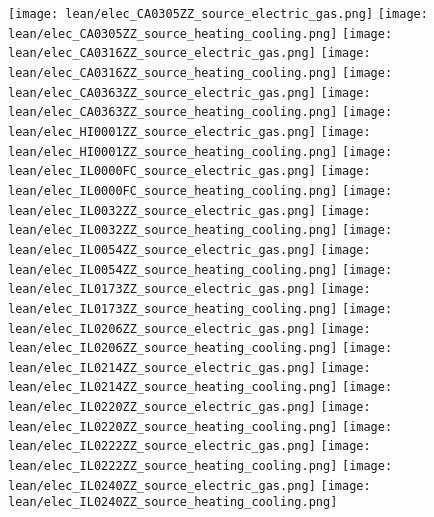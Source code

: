 \texttt{[image: lean/elec\_CA0305ZZ\_source\_electric\_gas.png]}
\texttt{[image: lean/elec\_CA0305ZZ\_source\_heating\_cooling.png]}
\texttt{[image: lean/elec\_CA0316ZZ\_source\_electric\_gas.png]}
\texttt{[image: lean/elec\_CA0316ZZ\_source\_heating\_cooling.png]}
\texttt{[image: lean/elec\_CA0363ZZ\_source\_electric\_gas.png]}
\texttt{[image: lean/elec\_CA0363ZZ\_source\_heating\_cooling.png]}
\texttt{[image: lean/elec\_HI0001ZZ\_source\_electric\_gas.png]}
\texttt{[image: lean/elec\_HI0001ZZ\_source\_heating\_cooling.png]}
\texttt{[image: lean/elec\_IL0000FC\_source\_electric\_gas.png]}
\texttt{[image: lean/elec\_IL0000FC\_source\_heating\_cooling.png]}
\texttt{[image: lean/elec\_IL0032ZZ\_source\_electric\_gas.png]}
\texttt{[image: lean/elec\_IL0032ZZ\_source\_heating\_cooling.png]}
\texttt{[image: lean/elec\_IL0054ZZ\_source\_electric\_gas.png]}
\texttt{[image: lean/elec\_IL0054ZZ\_source\_heating\_cooling.png]}
\texttt{[image: lean/elec\_IL0173ZZ\_source\_electric\_gas.png]}
\texttt{[image: lean/elec\_IL0173ZZ\_source\_heating\_cooling.png]}
\texttt{[image: lean/elec\_IL0206ZZ\_source\_electric\_gas.png]}
\texttt{[image: lean/elec\_IL0206ZZ\_source\_heating\_cooling.png]}
\texttt{[image: lean/elec\_IL0214ZZ\_source\_electric\_gas.png]}
\texttt{[image: lean/elec\_IL0214ZZ\_source\_heating\_cooling.png]}
\texttt{[image: lean/elec\_IL0220ZZ\_source\_electric\_gas.png]}
\texttt{[image: lean/elec\_IL0220ZZ\_source\_heating\_cooling.png]}
\texttt{[image: lean/elec\_IL0222ZZ\_source\_electric\_gas.png]}
\texttt{[image: lean/elec\_IL0222ZZ\_source\_heating\_cooling.png]}
\texttt{[image: lean/elec\_IL0240ZZ\_source\_electric\_gas.png]}
\texttt{[image: lean/elec\_IL0240ZZ\_source\_heating\_cooling.png]}
